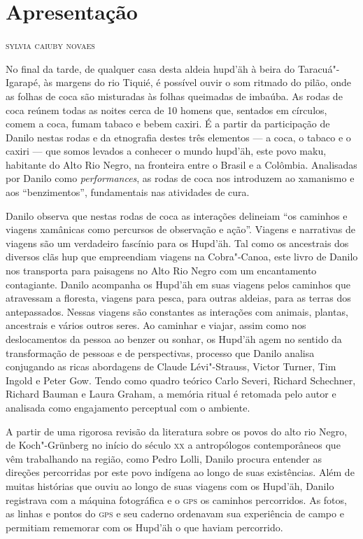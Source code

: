 \chapter[Apresentação]{Apresentação}

\begin{flushright}
\textsc{sylvia caiuby novaes}
\end{flushright}

\noindent{}No final da tarde, de qualquer casa desta aldeia hupd'äh à beira do
Taracuá"-Igarapé, às margens do rio Tiquié, é possível ouvir o som
ritmado do pilão, onde as folhas de coca são misturadas às folhas
queimadas de imbaúba. As rodas de coca reúnem todas as noites cerca de
10 homens que, sentados em círculos, comem a coca, fumam tabaco e bebem
caxiri. É a partir da participação de Danilo nestas rodas e da
etnografia destes três elementos --- a coca, o tabaco e o caxiri --- que
somos levados a conhecer o mundo hupd'äh, este povo maku, habitante do
Alto Rio Negro, na fronteira entre o Brasil e a Colômbia. Analisadas por
Danilo como \emph{performances}, as rodas de coca nos introduzem ao
xamanismo e aos ``benzimentos'', fundamentais nas atividades de cura.

Danilo observa que nestas rodas de coca as interações delineiam ``os
caminhos e viagens xamânicas como percursos de observação e ação''.
Viagens e narrativas de viagens são um verdadeiro fascínio para os
Hupd'äh. Tal como os ancestrais dos diversos clãs hup que empreendiam
viagens na Cobra"-Canoa, este livro de Danilo nos transporta para
paisagens no Alto Rio Negro com um encantamento contagiante. Danilo
acompanha os Hupd'äh em suas viagens pelos caminhos que atravessam a
floresta, viagens para pesca, para outras aldeias, para as terras dos
antepassados. Nessas viagens são constantes as interações com animais,
plantas, ancestrais e vários outros seres. Ao caminhar e viajar, assim
como nos deslocamentos da pessoa ao benzer ou sonhar, os Hupd'äh agem no
sentido da transformação de pessoas e de perspectivas, processo que
Danilo analisa conjugando as ricas abordagens de Claude Lévi"-Strauss,
Victor Turner, Tim Ingold e Peter Gow. Tendo como quadro teórico Carlo
Severi, Richard Schechner, Richard Bauman e Laura Graham, a memória
ritual é retomada pelo autor e analisada como engajamento perceptual com
o ambiente.

A partir de uma rigorosa revisão da literatura sobre os povos do alto
rio Negro, de Koch"-Grünberg no início do século \textsc{xx} a antropólogos
contemporâneos que vêm trabalhando na região, como Pedro Lolli, Danilo
procura entender as direções percorridas por este povo indígena ao longo
de suas existências. Além de muitas histórias que ouviu ao longo de suas
viagens com os Hupd'äh, Danilo registrava com a máquina fotográfica e o
\textsc{gps} os caminhos percorridos. As fotos, as linhas e pontos do \textsc{gps} e seu
caderno ordenavam sua experiência de campo e permitiam rememorar com os
Hupd'äh o que haviam percorrido.

